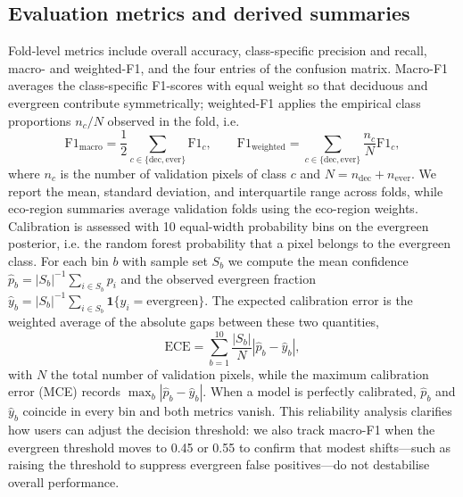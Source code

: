 \documentclass[utf8]{FrontiersinHarvard}
\begin{document}
\subsection{Evaluation metrics and derived summaries}
\label{sec:metrics}
Fold-level metrics include overall accuracy, class-specific precision and recall, macro- and weighted-F1, and the four entries of the confusion matrix. Macro-F1 averages the class-specific F1-scores with equal weight so that deciduous and evergreen contribute symmetrically; weighted-F1 applies the empirical class proportions \(n_c/N\) observed in the fold, i.e.
\begin{equation*}
    \mathrm{F1}_{\text{macro}} = \frac{1}{2} \sum_{c \in \{\text{dec}, \text{ever}\}} \mathrm{F1}_c,
    \qquad
    \mathrm{F1}_{\text{weighted}} = \sum_{c \in \{\text{dec}, \text{ever}\}} \frac{n_c}{N} \mathrm{F1}_c,
\end{equation*}
where \(n_c\) is the number of validation pixels of class \(c\) and \(N = n_{\text{dec}} + n_{\text{ever}}\). We report the mean, standard deviation, and interquartile range across folds, while eco-region summaries average validation folds using the eco-region weights. Calibration is assessed with 10 equal-width probability bins on the evergreen posterior, i.e. the random forest probability that a pixel belongs to the evergreen class. For each bin \(b\) with sample set \(S_b\) we compute the mean confidence \(\hat{p}_b = |S_b|^{-1} \sum_{i \in S_b} p_i\) and the observed evergreen fraction \(\hat{y}_b = |S_b|^{-1} \sum_{i \in S_b} \mathbf{1}\{y_i = \text{evergreen}\}\). The expected calibration error is the weighted average of the absolute gaps between these two quantities,
\begin{equation*}
    \mathrm{ECE} = \sum_{b=1}^{10} \frac{|S_b|}{N} \left| \hat{p}_b - \hat{y}_b \right|,
\end{equation*}
with \(N\) the total number of validation pixels, while the maximum calibration error (MCE) records \(\max_b \left| \hat{p}_b - \hat{y}_b \right|\). When a model is perfectly calibrated, \(\hat{p}_b\) and \(\hat{y}_b\) coincide in every bin and both metrics vanish. This reliability analysis clarifies how users can adjust the decision threshold: we also track macro-F1 when the evergreen threshold moves to 0.45 or 0.55 to confirm that modest shifts—such as raising the threshold to suppress evergreen false positives—do not destabilise overall performance.
\end{document}
